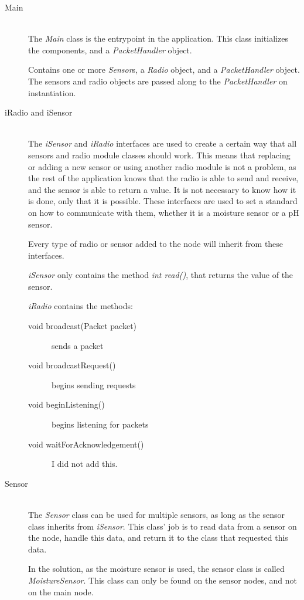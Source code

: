 \begin{description}
\item[Main] \hfill \\
The \textit{Main} class is the entrypoint in the application. This class initializes the components, and a \textit{PacketHandler} object.

Contains one or more \textit{Sensor}s, a \textit{Radio} object, and a \textit{PacketHandler} object. The sensors and radio objects are passed along to the \textit{PacketHandler} on instantiation.

\item[iRadio and iSensor] \hfill \\
The \textit{iSensor} and \textit{iRadio} interfaces are used to create a certain way that all sensors and radio module classes should work. This means that replacing or adding a new sensor or using another radio module is not a problem, as the rest of the application knows that the radio is able to send and receive, and the sensor is able to return a value. 
It is not necessary to know how it is done, only that it is possible. These interfaces are used to set a standard on how to communicate with them, whether it is a moisture sensor or a pH sensor.

Every type of radio or sensor added to the node will inherit from these interfaces.


\textit{iSensor} only contains the method \textit{int read()}, that returns the value of the sensor.

\textit{iRadio} contains the methods:
\begin{description}
\item[void broadcast(Packet packet)] sends a packet
\item[void broadcastRequest()] begins sending requests
\item[void beginListening()] begins listening for packets
\item[void waitForAcknowledgement()] I did not add this. 
\end{description}

\item[Sensor] \hfill \\
The \textit{Sensor} class can be used for multiple sensors, as long as the sensor class inherits from \textit{iSensor}. This class' job is to read data from a sensor on the node, handle this data, and return it to the class that requested this data.

In the solution, as the moisture sensor is used, the sensor class is called \textit{MoistureSensor}. This class can only be found on the sensor nodes, and not on the main node.



\end{description}
